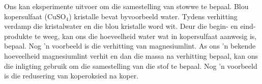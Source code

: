 Ons kan eksperimente uitvoer om die samestelling van stowwe te bepaal. Blou kopersulfaat ($\text{CuSO}_{4}$) kristalle bevat byvoorbeeld water. Tydens verhitting verdamp die kristalwater en die blou kristalle word wit. Deur die begin- en eind- produkte te weeg, kan ons die hoeveelheid water wat in kopersulfaat aanwesig is, bepaal. Nog 'n voorbeeld is die verhitting van magnesiumlint. As ons 'n bekende hoeveelheid magnesiumlint verhit en dan die massa na verhitting bepaal, kan ons die inligting gebruik om die samestelling van die stof te bepaal. Nog 'n voorbeeld is die redusering van koperoksied na koper.

    \noindent

